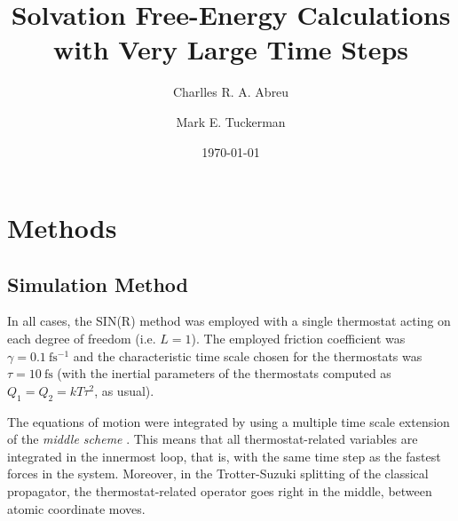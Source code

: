 \documentclass[
aip,
jcp,
reprint,
]{revtex4-1}
\begin{document}
\author{Charlles R. A. Abreu}

\author{Mark E. Tuckerman}

\title{Solvation Free-Energy Calculations with Very Large Time Steps}


\date{\today}

\maketitle

\section{Methods}
\label{sec:methods}

\subsection{Simulation Method}
\label{sec: simulation method}

In all cases, the SIN(R) method \cite{Leimkuhler_2013} was employed with a single thermostat acting on each degree of freedom (i.e. $L = 1$).
The employed friction coefficient was $\gamma = 0.1~\mathrm{fs^{-1}}$ and the characteristic time scale chosen for the thermostats was $\tau = 10~\mathrm{fs}$ (with the inertial parameters of the thermostats computed as $Q_1 = Q_2 = kT \tau^2$, as usual).

The equations of motion were integrated by using a multiple time scale extension of the \textit{middle scheme} \cite{Zhang_2017}.
This means that all thermostat-related variables are integrated in the innermost loop, that is, with the same time step as the fastest forces in the system.
Moreover, in the Trotter-Suzuki splitting of the classical propagator, the thermostat-related operator goes right in the middle, between atomic coordinate moves.
\end{document}
